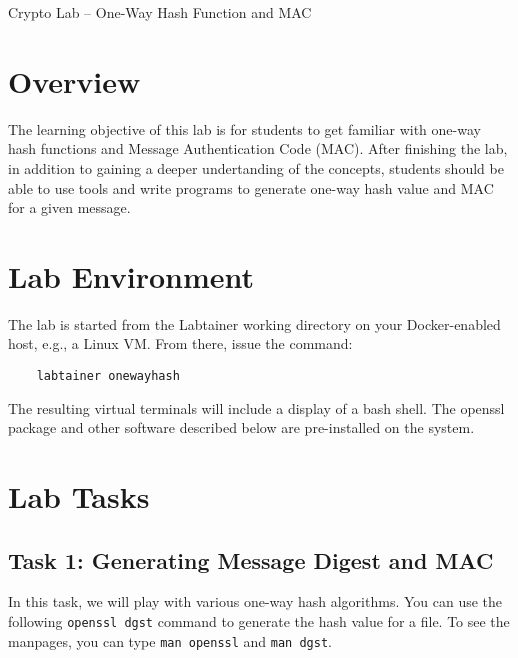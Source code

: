 







\begin{center}
{\LARGE Crypto Lab -- One-Way Hash Function and MAC}
\end{center}

\copyrightnotice

\setcounter{task}{1}
\newcommand{\tasks} {\bf {\noindent (\arabic{task})} \addtocounter{task}{1} \,}

\section{Overview}

The learning objective of this lab is for students to get familiar with
one-way hash functions and Message Authentication Code (MAC). After 
finishing the lab, in addition to gaining a deeper undertanding
of the concepts, students should be able to 
use tools and 
write programs to generate one-way hash value and MAC for 
a given message.


\section{Lab Environment}
The lab is started from the Labtainer working
directory on your Docker-enabled host, e.g., a Linux VM.
From there, issue the command:
\begin{verbatim}
    labtainer onewayhash
\end{verbatim}
The resulting virtual terminals will include a display of
a bash shell.  The openssl package
and other software described below are pre-installed
on the system.


\section{Lab Tasks}

\subsection{Task 1: Generating Message Digest and MAC}

In this task, we will play with various one-way hash algorithms. 
You can use the following {\tt openssl dgst} 
command to generate the hash value for a file. To see the manpages, you can 
type {\tt man openssl} and {\tt man dgst}.

